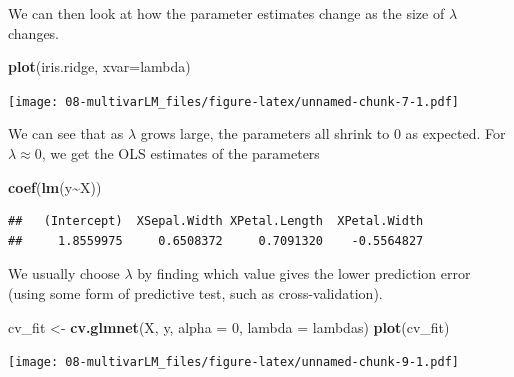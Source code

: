 \documentclass[
]{book}
\newenvironment{Shaded}{\begin{snugshade}}{\end{snugshade}}
\newcommand{\AttributeTok}[1]{\textcolor[rgb]{0.13,0.29,0.53}{#1}}
\newcommand{\CommentTok}[1]{\textcolor[rgb]{0.56,0.35,0.01}{\textit{#1}}}
\newcommand{\DecValTok}[1]{\textcolor[rgb]{0.00,0.00,0.81}{#1}}
\newcommand{\FunctionTok}[1]{\textcolor[rgb]{0.13,0.29,0.53}{\textbf{#1}}}
\newcommand{\NormalTok}[1]{#1}
\newcommand{\OtherTok}[1]{\textcolor[rgb]{0.56,0.35,0.01}{#1}}
\newcommand{\SpecialCharTok}[1]{\textcolor[rgb]{0.81,0.36,0.00}{\textbf{#1}}}
\newcommand{\StringTok}[1]{\textcolor[rgb]{0.31,0.60,0.02}{#1}}
\theoremstyle{definition}
\theoremstyle{definition}
\theoremstyle{definition}
\theoremstyle{definition}
\theoremstyle{remark}
\begin{document}
We can then look at how the parameter estimates change as the size of \(\lambda\) changes.

\begin{Shaded}
\begin{Highlighting}[]
\FunctionTok{plot}\NormalTok{(iris.ridge, }\AttributeTok{xvar=}\StringTok{\textquotesingle{}lambda\textquotesingle{}}\NormalTok{) }
\end{Highlighting}
\end{Shaded}

\texttt{[image: 08-multivarLM\_files/figure-latex/unnamed-chunk-7-1.pdf]}

\begin{Shaded}
\end{Shaded}

We can see that as \(\lambda\) grows large, the parameters all shrink to \(0\) as expected. For \(\lambda\approx 0\), we get the OLS estimates of the parameters

\begin{Shaded}
\begin{Highlighting}[]
\FunctionTok{coef}\NormalTok{(}\FunctionTok{lm}\NormalTok{(y}\SpecialCharTok{\textasciitilde{}}\NormalTok{X))}
\end{Highlighting}
\end{Shaded}

\begin{verbatim}
##   (Intercept)  XSepal.Width XPetal.Length  XPetal.Width 
##     1.8559975     0.6508372     0.7091320    -0.5564827
\end{verbatim}

We usually choose \(\lambda\) by finding which value gives the lower prediction error (using some form of predictive test, such as cross-validation).

\begin{Shaded}
\begin{Highlighting}[]
\NormalTok{cv\_fit }\OtherTok{\textless{}{-}} \FunctionTok{cv.glmnet}\NormalTok{(X, y, }\AttributeTok{alpha =} \DecValTok{0}\NormalTok{, }\AttributeTok{lambda =}\NormalTok{ lambdas)}
\FunctionTok{plot}\NormalTok{(cv\_fit)}
\end{Highlighting}
\end{Shaded}

\texttt{[image: 08-multivarLM\_files/figure-latex/unnamed-chunk-9-1.pdf]}
\end{document}
